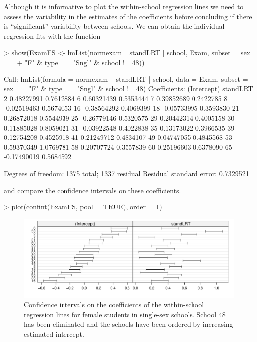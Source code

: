 \documentclass[12pt]{article}
\begin{document}
Although it is informative to plot the within-school regression lines
we need to assess the variability in the estimates of the coefficients
before concluding if there is ``significant'' variability between
schools.  We can obtain the individual regression fits with the
 function
\begin{Schunk}
\begin{Sinput}
> show(ExamFS <- lmList(normexam ~ standLRT | school, Exam, subset = sex == 
+     "F" & type == "Sngl" & school != 48))
\end{Sinput}
\begin{Soutput}
Call: lmList(formula = normexam ~ standLRT | school, data = Exam, subset = sex ==      "F" & type == "Sngl" & school != 48) 
Coefficients:
   (Intercept)  standLRT
2   0.48227991 0.7612884
6   0.60321439 0.5353444
7   0.39852689 0.2422785
8  -0.02519463 0.5674053
16 -0.38564292 0.4069399
18 -0.05733995 0.3593830
21  0.26872018 0.5544939
25 -0.26779146 0.5320575
29  0.20442314 0.4005158
30  0.11885028 0.8059021
31 -0.03922548 0.4022838
35  0.13173022 0.3966535
39  0.12754208 0.4525918
41  0.21249712 0.4834107
49  0.04747055 0.4845568
53  0.59370349 1.0769781
58  0.20707724 0.3557839
60  0.25196603 0.6378090
65 -0.17490019 0.5684592

Degrees of freedom: 1375 total; 1337 residual
Residual standard error: 0.7329521
\end{Soutput}
\end{Schunk}
and compare the confidence intervals on these coefficients.
\begin{Schunk}
\begin{Sinput}
> plot(confint(ExamFS, pool = TRUE), order = 1)
\end{Sinput}
\end{Schunk}
\begin{figure}[tbp]
  \centering
  \includegraphics[width=\textwidth]{figs/SoftRev-Examplot4c}
  \caption{Confidence intervals on the coefficients of the
    within-school regression lines for female students in single-sex
    schools. School 48 has been eliminated and the schools have been
    ordered by increasing estimated intercept.}
  \label{fig:Examplot4c}
\end{figure}
\end{document}
